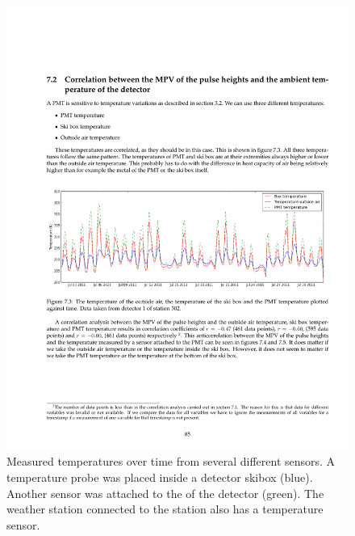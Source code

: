 \begin{figure}
    \centering
    \includegraphics[width=\linewidth]{plots/detector/temperature_timeline}
    \caption{Measured temperatures over time from several different sensors. A temperature probe was placed inside a \hisparc detector skibox (blue). Another sensor was attached to the \pmt of the detector (green). The weather station connected to the \hisparc station also has a temperature sensor.}
    \label{fig:temperature_timeline}
\end{figure}

